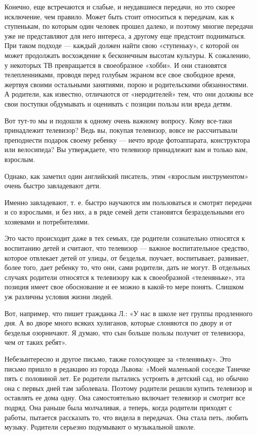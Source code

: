 \documentclass[12pt, a4paper, openany]{book}
\begin{document}
Конечно, еще встречаются и слабые, и неудавшиеся передачи, но это скорее исключение, чем правило. Может быть стоит относиться к передачам, как к ступенькам, по которым один человек прошел далеко, и поэтому многие передачи уже не представляют для него интереса, а другому еще предстоит подниматься. При таком подходе — каждый должен найти свою «ступеньку», с которой он может продолжать восхождение к бесконечным высотам культуры. К сожалению, у некоторых ТВ превращается в своеобразное «хобби». И они становятся телепленниками, проводя перед голубым экраном все свое свободное время, жертвуя своими остальными занятиями, порою и родительскими обязанностями. А родители, как известно, отличаются от «неродителей» тем, что они должны все свои поступки обдумывать и оценивать с позиции пользы или вреда детям. 

Вот тут-то мы и подошли к одному очень важному вопросу. Кому все-таки принадлежит телевизор? Ведь вы, покупая телевизор, вовсе не рассчитывали преподнести подарок своему ребенку — нечто вроде фотоаппарата, конструктора или велосипеда? Вы утверждаете, что телевизор принадлежит вам и только вам, взрослым. 

Однако, как заметил один английский писатель, этим «взрослым инструментом» очень быстро завладевают дети. 

Именно завладевают, т. е. быстро научаются им пользоваться и смотрят передачи и со взрослыми, и без них, а в ряде семей дети становятся безраздельными его хозяевами и потребителями. 

Это часто происходит даже в тех семьях, где родители сознательно относятся к воспитанию детей и считают, что телевизор — важное воспитательное средство, которое отвлекает детей от улицы, от безделья, поучает, воспитывает, развивает, более того, дает ребенку то, что они, сами родители, дать не могут. В отдельных случаях родители относятся к телевизору как к своеобразной «теленяньке», эта позиция имеет свое обоснование и ее можно в какой-то мере понять. Слишком уж различны условия жизни людей. 

Вот, например, что пишет гражданка Л.: «У нас в школе нет группы продленного дня. А во дворе много всяких хулиганов, которые слоняются по двору и от безделья озорничают. Я думаю, что сын больше пользы получит от телевизора, чем от таких ребят». 

Небезынтересно и другое письмо, также голосующее за «теленяньку». Это письмо пришло в редакцию из города Львова: «Моей маленькой соседке Танечке пять с половиной лет. Ее родители пытались устроить в детский сад, но обычно она с первых дней там заболевала. Поэтому родители решили купить телевизор и оставлять ее дома одну. Она самостоятельно включает телевизор и смотрит все подряд. Она раньше была молчаливая, а теперь, когда родители приходят с работы, пытается рассказать то, что видела в передачах. Она стала петь, любить музыку. Родители серьезно подумывают о музыкальной школе. 
\end{document}
